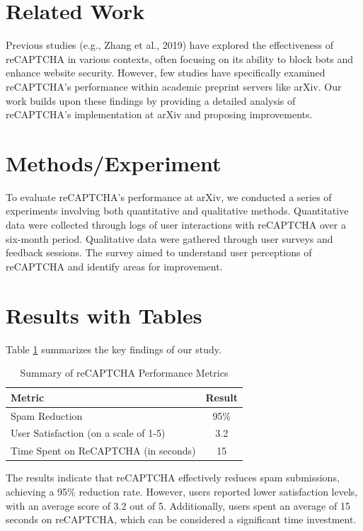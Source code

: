 \section{Related Work}
Previous studies (e.g., Zhang et al., 2019) have explored the effectiveness of reCAPTCHA in various contexts, often focusing on its ability to block bots and enhance website security. However, few studies have specifically examined reCAPTCHA’s performance within academic preprint servers like arXiv. Our work builds upon these findings by providing a detailed analysis of reCAPTCHA’s implementation at arXiv and proposing improvements.

\section{Methods/Experiment}
To evaluate reCAPTCHA’s performance at arXiv, we conducted a series of experiments involving both quantitative and qualitative methods. Quantitative data were collected through logs of user interactions with reCAPTCHA over a six-month period. Qualitative data were gathered through user surveys and feedback sessions. The survey aimed to understand user perceptions of reCAPTCHA and identify areas for improvement.

\section{Results with Tables}
Table \ref{tab:results} summarizes the key findings of our study.

\begin{table}[htbp]
\centering
\begin{tabular}{|l|c|}
\hline
\textbf{Metric} & \textbf{Result} \\
\hline
Spam Reduction & 95\% \\
User Satisfaction (on a scale of 1-5) & 3.2 \\
Time Spent on ReCAPTCHA (in seconds) & 15 \\
\hline
\end{tabular}
\caption{Summary of reCAPTCHA Performance Metrics}
\label{tab:results}
\end{table}

The results indicate that reCAPTCHA effectively reduces spam submissions, achieving a 95\% reduction rate. However, users reported lower satisfaction levels, with an average score of 3.2 out of 5. Additionally, users spent an average of 15 seconds on reCAPTCHA, which can be considered a significant time investment.

